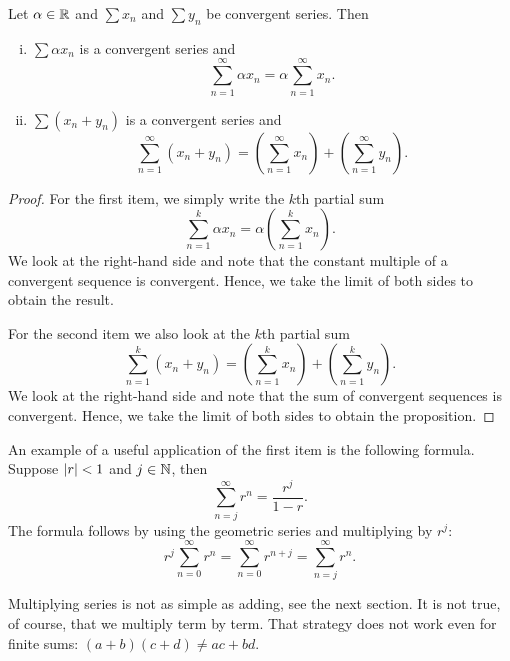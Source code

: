 \begin{prop}
Let $\alpha \in {\mathbb{R}}$ and $\sum x_n$ and $\sum y_n$ be
convergent series.  Then
\begin{enumerate}[(i)]
\item
$\sum \alpha x_n$ is a convergent series and
\begin{equation*}
\sum_{n=1}^\infty \alpha x_n
=
\alpha \sum_{n=1}^\infty x_n .
\end{equation*}
\item
$\sum ( x_n + y_n )$ is a convergent series and
\begin{equation*}
\sum_{n=1}^\infty ( x_n + y_n ) 
=
\left( \sum_{n=1}^\infty x_n \right)
+
\left( \sum_{n=1}^\infty y_n \right) .
\end{equation*}
\end{enumerate}
\end{prop}

\begin{proof}
For the first item,
we simply write the $k$th partial sum
\begin{equation*}
\sum_{n=1}^k \alpha x_n
=
\alpha \left( \sum_{n=1}^k x_n \right) .
\end{equation*}
We look at the right-hand side and note that the constant multiple of
a convergent sequence
is convergent.  Hence, we take the limit of both sides to obtain
the result.

For the second item we also look at the
$k$th partial sum
\begin{equation*}
\sum_{n=1}^k ( x_n + y_n ) 
=
\left( \sum_{n=1}^k x_n \right)
+
\left( \sum_{n=1}^k y_n \right) .
\end{equation*}
We look at the right-hand side and note that the sum of convergent sequences
is convergent.  Hence, we take the limit of both sides to obtain
the proposition.
\end{proof}

An example of a useful application of the first item is the following
formula.  Suppose $\left\lvert {r} \right\rvert < 1$ and $j \in {\mathbb{N}}$, then
\begin{equation*}
\sum_{n=j}^\infty r^n = \frac{r^j}{1-r} .
\end{equation*}
The formula follows by using the geometric series and multiplying by
$r^j$:
\begin{equation*}
r^j \sum_{n=0}^\infty r^n =
\sum_{n=0}^\infty r^{n+j}
=
\sum_{n=j}^\infty r^n .
\end{equation*}

Multiplying series is not as simple as adding, see the next
section.
It is not true, of course, that we multiply
term by term.  That strategy does not work even for finite sums:
$(a+b)(c+d) \not= ac+bd$.

